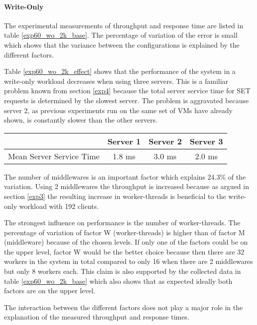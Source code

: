 \documentclass[report.tex]{subfiles}
\begin{document}
\paragraph{Write-Only}

The experimental measurements of throughput and response time are listed in table \ref{exp60_wo_2k_base}.
The percentage of variation of the error is small which shows that the variance between the configurations is explained by the different factors.

Table \ref{exp60_wo_2k_effect} shows that the performance of the system in a write-only workload decreases when using three servers.  This is a familiar problem known from section \ref{exp4} because the total server service time for SET requests is determined by the slowest server. The problem is aggravated because server 2, as previous experiments run on the same set of VMs have already shown, is constantly slower than the other servers. 

\begin{center}
\begin{tabular}{|c|c|c|c|}
	\cline{2-4} 
	\multicolumn{1}{c|}{} & Server 1 & Server 2 & Server 3 \\ 
	\hline 
	Mean Server Service Time & 1.8 ms & 3.0 ms & 2.0 ms \\ 
	\hline 
\end{tabular} 
\end{center}

The number of middlewares is an important factor which explains 24.3\% of the variation. Using 2 middlewares the throughput is increased because as argued in section \ref{exp3} the resulting increase in worker-threads is beneficial to the write-only workload with 192 clients.

The strongest influence on performance is the number of worker-threads. 
The percentage of variation of factor W (worker-threads) is higher than of factor M (middleware) because of the chosen levels. If only one of the factors could be on the upper level, factor W would be the better choice 
because then there are 32 workers in the system in total compared to only 16 when there are 2 middlewares but only 8 workers each. This claim is also supported by the collected data in table \ref{exp60_wo_2k_base} which also shows that as expected ideally both factors are on the upper level.
	
The interaction between the different factors does not play a major role in the explanation of the measured throughput and response times.	
\end{document}
